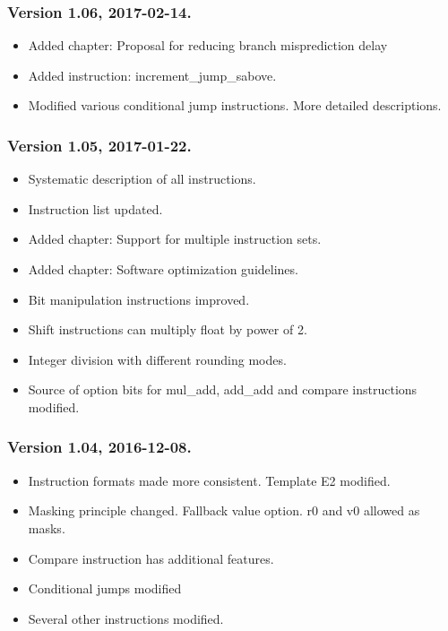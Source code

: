 \documentclass[forwardcom.tex]{subfiles}
\begin{document}
\subsubsection{Version 1.06, 2017-02-14.}
\begin{itemize}
\item Added chapter: Proposal for reducing branch misprediction delay
\item Added instruction: increment\_jump\_sabove.
\item Modified various conditional jump instructions. More detailed descriptions.
\end{itemize}


\subsubsection{Version 1.05, 2017-01-22.}
\begin{itemize}
\item Systematic description of all instructions.
\item Instruction list updated.
\item Added chapter: Support for multiple instruction sets.
\item Added chapter: Software optimization guidelines.
\item Bit manipulation instructions improved.
\item Shift instructions can multiply float by power of 2.
\item Integer division with different rounding modes.
\item Source of option bits for mul\_add, add\_add and compare instructions modified.
\end{itemize}


\subsubsection{Version 1.04, 2016-12-08.}
\begin{itemize}
\item Instruction formats made more consistent. Template E2 modified.
\item Masking principle changed. Fallback value option. r0 and v0 allowed as masks.
\item Compare instruction has additional features.
\item Conditional jumps modified
\item Several other instructions modified.
\end{itemize}
\end{document}
